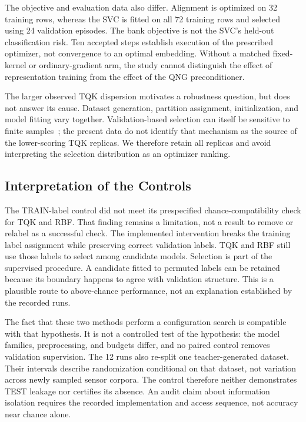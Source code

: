 The objective and evaluation data also differ. Alignment is optimized on 32 training rows, whereas the SVC is fitted on all 72 training rows and selected using 24 validation episodes. The bank objective is not the SVC's held-out classification risk. Ten accepted steps establish execution of the prescribed optimizer, not convergence to an optimal embedding. Without a matched fixed-kernel or ordinary-gradient arm, the study cannot distinguish the effect of representation training from the effect of the QNG preconditioner.

The larger observed TQK dispersion motivates a robustness question, but does not answer its cause. Dataset generation, partition assignment, initialization, and model fitting vary together. Validation-based selection can itself be sensitive to finite samples~\cite{cawley2010selection}; the present data do not identify that mechanism as the source of the lower-scoring TQK replicas. We therefore retain all replicas and avoid interpreting the selection distribution as an optimizer ranking.

\subsection{Interpretation of the Controls}
\label{sec:discussion-controls}

The TRAIN-label control did not meet its prespecified chance-compatibility check for TQK and RBF. That finding remains a limitation, not a result to remove or relabel as a successful check. The implemented intervention breaks the training label assignment while preserving correct validation labels. TQK and RBF still use those labels to select among candidate models. Selection is part of the supervised procedure. A candidate fitted to permuted labels can be retained because its boundary happens to agree with validation structure. This is a plausible route to above-chance performance, not an explanation established by the recorded runs.

The fact that these two methods perform a configuration search is compatible with that hypothesis. It is not a controlled test of the hypothesis: the model families, preprocessing, and budgets differ, and no paired control removes validation supervision. The 12 runs also re-split one teacher-generated dataset. Their intervals describe randomization conditional on that dataset, not variation across newly sampled sensor corpora. The control therefore neither demonstrates TEST leakage nor certifies its absence. An audit claim about information isolation requires the recorded implementation and access sequence, not accuracy near chance alone.

